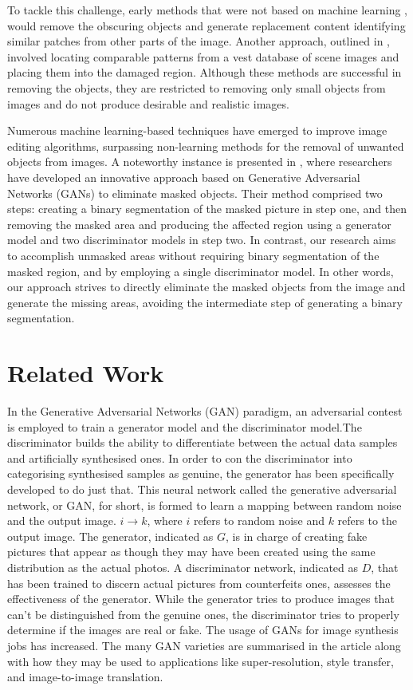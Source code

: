 \documentclass{36_styles/svproc}
\begin{document}
To tackle this challenge, early methods that were not based on machine learning \cite{1323101}, \cite{Darabi2012} would remove the obscuring objects and generate replacement content identifying similar patches from other parts of the image. Another approach, outlined in \cite{Hays:2007}, involved locating comparable patterns from a vest database of scene images and placing them into the damaged region. Although these methods are successful in removing the objects, they are restricted to removing only small objects from images and do not produce desirable and realistic images.

Numerous machine learning-based techniques have emerged to improve image editing algorithms, surpassing non-learning methods for the removal of unwanted objects from images. A noteworthy instance is presented in \cite{article0}, where researchers have developed an innovative approach based on Generative Adversarial Networks (GANs) to eliminate masked objects. Their method comprised two steps: creating a binary segmentation of the masked picture in step one, and then removing the masked area and producing the affected region using a generator model and two discriminator models in step two. In contrast, our research aims to accomplish unmasked areas without requiring binary segmentation of the masked region, and by employing a single discriminator model. In other words, our approach strives to directly eliminate the masked objects from the image and generate the missing areas, avoiding the intermediate step of generating a binary segmentation.

\section{Related Work}
In the Generative Adversarial Networks (GAN) \cite{goodfellow2014generative} paradigm, an adversarial contest is employed to train a generator model and the discriminator model.The discriminator builds the ability to differentiate between the actual data samples and artificially synthesised ones. In order to con the discriminator into categorising synthesised samples as genuine, the generator has been specifically developed to do just that. This neural network called the generative adversarial network, or GAN, for short, is formed to learn a mapping between random noise and the output image. $i \rightarrow k$,  where $i$ refers to random noise and $k$ refers to the output image. The generator, indicated as $G$, is in charge of creating fake pictures that appear as though they may have been created using the same distribution as the actual photos. A discriminator network, indicated as $D$, that has been trained to discern actual pictures from counterfeits ones, assesses the effectiveness of the generator. While the generator tries to produce images that can't be distinguished from the genuine ones, the discriminator tries to properly determine if the images are real or fake. The usage of GANs for image synthesis jobs has increased. The many GAN varieties are summarised in the article \cite{8195348} along with how they may be used to applications like super-resolution, style transfer, and image-to-image translation.
\end{document}
